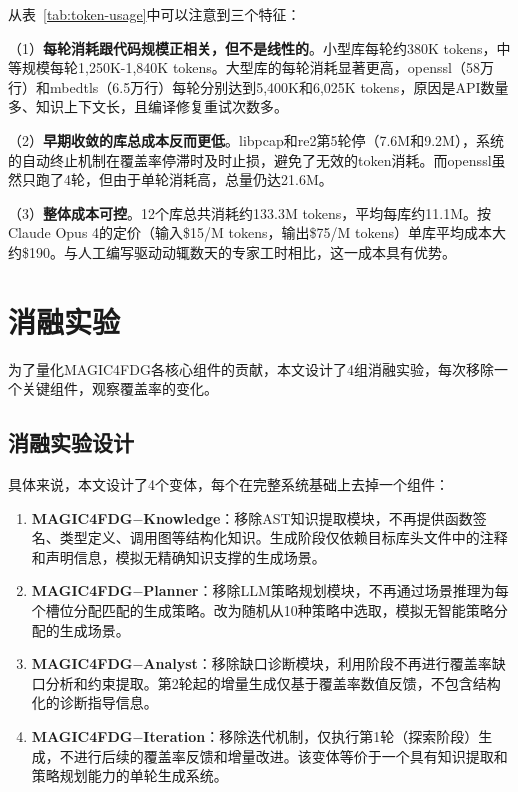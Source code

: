从表~\ref{tab:token-usage}中可以注意到三个特征：

（1）\textbf{每轮消耗跟代码规模正相关，但不是线性的}。小型库每轮约380K tokens，中等规模每轮1,250K-1,840K tokens。大型库的每轮消耗显著更高，openssl（58万行）和mbedtls（6.5万行）每轮分别达到5,400K和6,025K tokens，原因是API数量多、知识上下文长，且编译修复重试次数多。

（2）\textbf{早期收敛的库总成本反而更低}。libpcap和re2第5轮停（7.6M和9.2M），系统的自动终止机制在覆盖率停滞时及时止损，避免了无效的token消耗。而openssl虽然只跑了4轮，但由于单轮消耗高，总量仍达21.6M。

（3）\textbf{整体成本可控}。12个库总共消耗约133.3M tokens，平均每库约11.1M。按Claude Opus 4的定价（输入\$15/M tokens，输出\$75/M tokens）单库平均成本大约\$190。与人工编写驱动动辄数天的专家工时相比，这一成本具有优势。

\section{消融实验}

为了量化MAGIC4FDG各核心组件的贡献，本文设计了4组消融实验，每次移除一个关键组件，观察覆盖率的变化。

\subsection{消融实验设计}

具体来说，本文设计了4个变体，每个在完整系统基础上去掉一个组件：

\begin{enumerate}
\item \textbf{MAGIC4FDG$-$Knowledge}：移除AST知识提取模块，不再提供函数签名、类型定义、调用图等结构化知识。生成阶段仅依赖目标库头文件中的注释和声明信息，模拟无精确知识支撑的生成场景。

\item \textbf{MAGIC4FDG$-$Planner}：移除LLM策略规划模块，不再通过场景推理为每个槽位分配匹配的生成策略。改为随机从10种策略中选取，模拟无智能策略分配的生成场景。

\item \textbf{MAGIC4FDG$-$Analyst}：移除缺口诊断模块，利用阶段不再进行覆盖率缺口分析和约束提取。第2轮起的增量生成仅基于覆盖率数值反馈，不包含结构化的诊断指导信息。

\item \textbf{MAGIC4FDG$-$Iteration}：移除迭代机制，仅执行第1轮（探索阶段）生成，不进行后续的覆盖率反馈和增量改进。该变体等价于一个具有知识提取和策略规划能力的单轮生成系统。
\end{enumerate}

